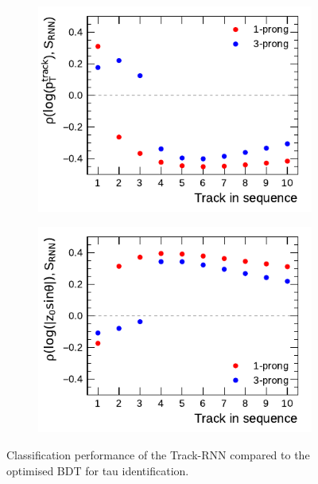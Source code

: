 \begin{figure}[ht]
  \centering
  \begin{subfigure}[t]{0.48\textwidth}
    \centering
    \includegraphics{./figures/rnn/track/pt_corr.pdf}
    \subcaption{}
  \end{subfigure}\hfill
  \begin{subfigure}[t]{0.48\textwidth}
    \centering
    \includegraphics{./figures/rnn/track/z0_corr.pdf}
    \subcaption{}
  \end{subfigure}
  \caption{Classification performance of the Track-RNN compared to the optimised
    BDT for tau identification.}
  \label{fig:track_rnn_roc_ratios}
\end{figure}


